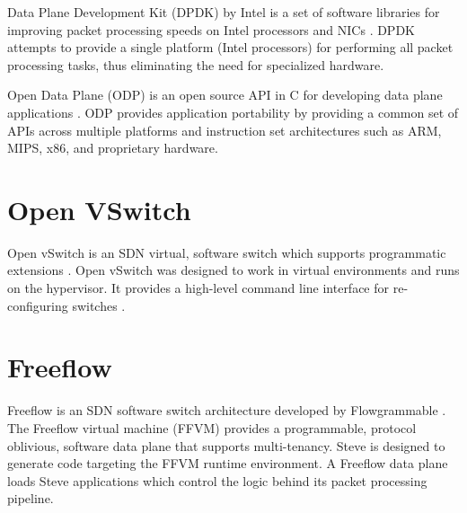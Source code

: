 Data Plane Development Kit (DPDK) by Intel is a set of software libraries for improving packet processing speeds on Intel processors and NICs \cite{dpdk_webpage}. DPDK attempts to provide a single platform (Intel processors) for performing all packet processing tasks, thus eliminating the need for specialized hardware.

Open Data Plane (ODP) is an open source API in C for developing data plane applications \cite{odp_webpage}. ODP provides application portability by providing a common set of APIs across multiple platforms and instruction set architectures such as ARM, MIPS, x86, and proprietary hardware.

\section{Open VSwitch}
\label{rel:vswitch}

Open vSwitch is an SDN virtual, software switch which supports programmatic extensions \cite{ovs_webpage, ovs2009extending, ovs2013}. Open vSwitch was designed to work in virtual environments and runs on the hypervisor. It provides a high-level command line interface for re-configuring switches \cite{ovs_man_page}.

\section{Freeflow}
\label{rel:freeflow}

Freeflow is an SDN software switch architecture developed
by Flowgrammable \cite{freeflow_software}. The Freeflow virtual machine (FFVM) 
provides a programmable, protocol oblivious, software data plane that 
supports multi-tenancy. Steve is
designed to generate code targeting the FFVM runtime environment. A Freeflow data 
plane loads Steve applications which control the logic behind its packet processing 
pipeline.

